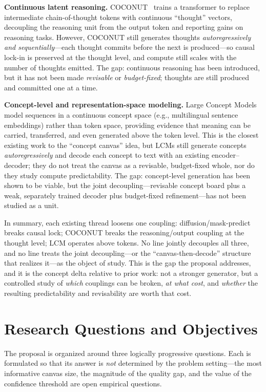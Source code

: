 \documentclass[11pt,a4paper]{article}
\begin{document}
\textbf{Continuous latent reasoning.} COCONUT~\cite{coconut} trains a transformer to replace intermediate chain-of-thought tokens with continuous ``thought'' vectors, decoupling the reasoning unit from the output token and reporting gains on reasoning tasks. However, COCONUT still generates thoughts \emph{autoregressively and sequentially}---each thought commits before the next is produced---so causal lock-in is preserved at the thought level, and compute still scales with the number of thoughts emitted. The gap: continuous reasoning has been introduced, but it has not been made \emph{revisable} or \emph{budget-fixed}; thoughts are still produced and committed one at a time.

\textbf{Concept-level and representation-space modeling.} Large Concept Models~\cite{lcm} model sequences in a continuous concept space (e.g., multilingual sentence embeddings) rather than token space, providing evidence that meaning can be carried, transferred, and even generated above the token level. This is the closest existing work to the ``concept canvas'' idea, but LCMs still generate concepts \emph{autoregressively} and decode each concept to text with an existing encoder--decoder; they do not treat the canvas as a revisable, budget-fixed whole, nor do they study compute predictability. The gap: concept-level generation has been shown to be viable, but the joint decoupling---revisable concept board plus a weak, separately trained decoder plus budget-fixed refinement---has not been studied as a unit.

In summary, each existing thread loosens one coupling: diffusion/mask-predict breaks causal lock; COCONUT breaks the reasoning/output coupling at the thought level; LCM operates above tokens. No line jointly decouples all three, and no line treats the joint decoupling---or the ``canvas-then-decode'' structure that realizes it---as the object of study. This is the gap the proposal addresses, and it is the concept delta relative to prior work: not a stronger generator, but a controlled study of \emph{which} couplings can be broken, \emph{at what cost}, and \emph{whether} the resulting predictability and revisability are worth that cost.

\section{Research Questions and Objectives}

The proposal is organized around three logically progressive questions. Each is formulated so that its answer is \emph{not} determined by the problem setting---the most informative canvas size, the magnitude of the quality gap, and the value of the confidence threshold are open empirical questions.
\end{document}
